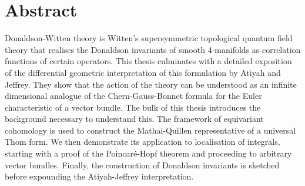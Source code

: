 \chapter*{Abstract}\label{abstract}


Donaldson-Witten theory is Witten's supersymmetric topological quantum field
theory that realises the Donaldson invariants of smooth 4-manifolds as
correlation functions of certain operators. This thesis culminates with a
detailed exposition of the differential geometric interpretation of this 
formulation by Atiyah and Jeffrey.
They show that the action of the theory can be understood as an
infinite dimensional analogue of the Chern-Gauss-Bonnet formula for the Euler
characteristic of a vector bundle. The bulk of this thesis introduces the background
necessary to understand this. The framework of equivariant cohomology is
used to construct the Mathai-Quillen representative of a universal 
Thom form. We then demonstrate its application to localisation
of integrals, starting with a proof of the Poincar\'e-Hopf theorem and
proceeding to arbitrary vector bundles. Finally, the construction of Donaldson 
invariants is sketched before expounding the Atiyah-Jeffrey interpretation. 



